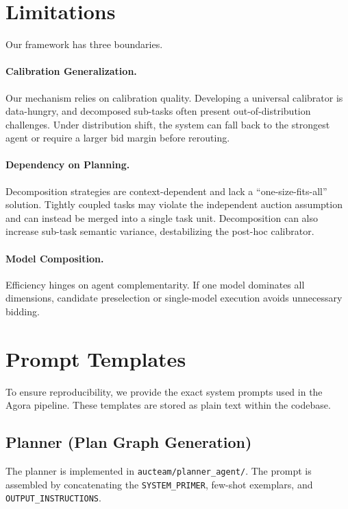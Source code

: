 \documentclass[11pt]{article}
\begin{document}
\section*{Limitations}

Our framework has three boundaries.

\paragraph{Calibration Generalization.}
Our mechanism relies on calibration quality. Developing a universal calibrator is data-hungry, and decomposed sub-tasks often present out-of-distribution challenges. Under distribution shift, the system can fall back to the strongest agent or require a larger bid margin before rerouting.

\paragraph{Dependency on Planning.}
Decomposition strategies are context-dependent and lack a ``one-size-fits-all'' solution. Tightly coupled tasks may violate the independent auction assumption and can instead be merged into a single task unit. Decomposition can also increase sub-task semantic variance, destabilizing the post-hoc calibrator.

\paragraph{Model Composition.}
Efficiency hinges on agent complementarity. If one model dominates all dimensions, candidate preselection or single-model execution avoids unnecessary bidding.



\appendix

\section{Prompt Templates}
\label{app:prompts}

To ensure reproducibility, we provide the exact system prompts used in the Agora pipeline. These templates are stored as plain text within the codebase.

\subsection{Planner (Plan Graph Generation)}
The planner is implemented in \texttt{aucteam/planner\_agent/}. The prompt is assembled by concatenating the \texttt{SYSTEM\_PRIMER}, few-shot exemplars, and \texttt{OUTPUT\_INSTRUCTIONS}.
\end{document}
